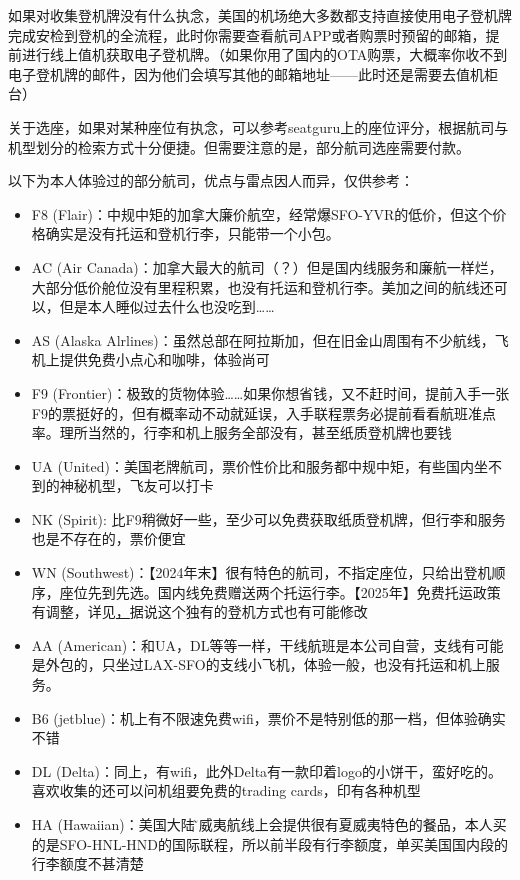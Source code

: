 如果对收集登机牌没有什么执念，美国的机场绝大多数都支持直接使用电子登机牌完成安检到登机的全流程，此时你需要查看航司APP或者购票时预留的邮箱，提前进行线上值机获取电子登机牌。（如果你用了国内的OTA购票，大概率你收不到电子登机牌的邮件，因为他们会填写其他的邮箱地址——此时还是需要去值机柜台）

关于选座，如果对某种座位有执念，可以参考seatguru上的座位评分，根据航司与机型划分的检索方式十分便捷。但需要注意的是，部分航司选座需要付款。

以下为本人体验过的部分航司，优点与雷点因人而异，仅供参考：
\begin{itemize}
    \item F8 (Flair)：中规中矩的加拿大廉价航空，经常爆SFO-YVR的低价，但这个价格确实是没有托运和登机行李，只能带一个小包。
    \item AC (Air Canada)：加拿大最大的航司（？）但是国内线服务和廉航一样烂，大部分低价舱位没有里程积累，也没有托运和登机行李。美加之间的航线还可以，但是本人睡似过去什么也没吃到……
    \item AS (Alaska Alrlines)：虽然总部在阿拉斯加，但在旧金山周围有不少航线，飞机上提供免费小点心和咖啡，体验尚可
    \item F9 (Frontier)：极致的货物体验……如果你想省钱，又不赶时间，提前入手一张F9的票挺好的，但有概率动不动就延误，入手联程票务必提前看看航班准点率。理所当然的，行李和机上服务全部没有，甚至纸质登机牌也要钱
    \item UA (United)：美国老牌航司，票价性价比和服务都中规中矩，有些国内坐不到的神秘机型，飞友可以打卡
    \item NK (Spirit): 比F9稍微好一些，至少可以免费获取纸质登机牌，但行李和服务也是不存在的，票价便宜
    \item WN (Southwest)：【2024年末】很有特色的航司，不指定座位，只给出登机顺序，座位先到先选。国内线免费赠送两个托运行李。【2025年】免费托运政策有调整，详见\href{https://support.southwest.com/helpcenter/s/article/policy-changes}，据说这个独有的登机方式也有可能修改
    \item AA (American)：和UA，DL等等一样，干线航班是本公司自营，支线有可能是外包的，只坐过LAX-SFO的支线小飞机，体验一般，也没有托运和机上服务。
    \item B6 (jetblue)：机上有不限速免费wifi，票价不是特别低的那一档，但体验确实不错
    \item DL (Delta)：同上，有wifi，此外Delta有一款印着logo的小饼干，蛮好吃的。喜欢收集的还可以问机组要免费的trading cards，印有各种机型
    \item HA (Hawaiian)：美国大陆\~夏威夷航线上会提供很有夏威夷特色的餐品，本人买的是SFO-HNL-HND的国际联程，所以前半段有行李额度，单买美国国内段的行李额度不甚清楚
    
\end{itemize}

